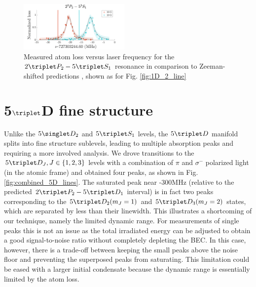 \begin{figure}[t]
    \centering
    \includegraphics[width=0.48\textwidth]{fig/spectroscopy/ci-plot-53S1-eps-converted-to.pdf}
    \caption{Measured atom loss versus laser frequency for the $2\triplet P_2 - 5\triplet S_1$ resonance in comparison to Zeeman-shifted predictions \cite{Drake07}, shown as for Fig. \ref{fig:1D_2_line}}
    \label{fig:5_3S_1}
\end{figure}

\section{5$\triplet$D fine structure}

Unlike the $5\singlet D_2$ and $5\triplet S_1$ levels, the $5\triplet D$ manifold splits into fine structure sublevels, leading to multiple absorption peaks and requiring a more involved analysis. We drove transitions to the $5\triplet D_J, J\in\{1,2,3\}$ levels with a combination of $\pi$ and $\sigma^-$ polarized light (in the atomic frame) and obtained four peaks, as shown in Fig. \ref{fig:combined_5D_lines}. The saturated peak near -300MHz (relative to the predicted $2\triplet P_2 - 5\triplet D_1$ interval) is in fact two peaks corresponding to the $5\triplet D_2(m_J=1)$ and $5\triplet D_3(m_J=2)$ states, which are separated by less than their linewidth. This illustrates a shortcoming of our technique, namely the limited dynamic range. For measurements of single peaks this is not an issue as the total irradiated energy can be adjusted to obtain a good signal-to-noise ratio without completely depleting the BEC. In this case, however, there is a trade-off between keeping the small peaks above the noise floor and preventing the superposed peaks from saturating. This limitation could be eased with a larger initial condensate because the dynamic range is essentially limited by the atom loss.

